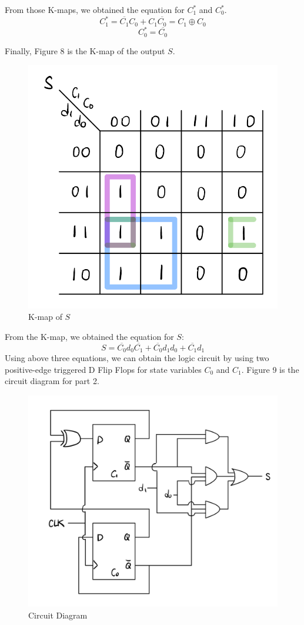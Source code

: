 \documentclass{article}
\begin{document}
From those K-maps, we obtained the equation for $C_1^*$ and $C_0^*$.
\begin{equation}
    C_1^* = \overline{C_1} C_0 + C_1 \overline{C_0} = C_1 \oplus C_0
\end{equation}
\begin{equation}
    C_0^* = \overline{C_0}
\end{equation}

Finally, Figure 8 is the K-map of the output $S$.

\begin{figure}[!ht]
    \centering
    \includegraphics[width=.3\linewidth]{src/Part 2_Kmap_S.png}
    \caption{K-map of $S$}
\end{figure}

From the K-map, we obtained the equation for $S$:
\begin{equation}
    S = \overline{C_0} d_0 \overline{C_1} + \overline{C_0} d_1 d_0 + \overline{C_1} d_1 
\end{equation}
Using above three equations, we can obtain the logic circuit by using two positive-edge triggered D Flip Flops for state variables $C_0$ and $C_1$. Figure 9 is the circuit diagram for part 2.
\begin{figure}[!ht]
    \centering
    \includegraphics[width=.75\linewidth]{src/Part 2_Circuit Diagram.png}
    \caption{Circuit Diagram}
\end{figure}
\end{document}
